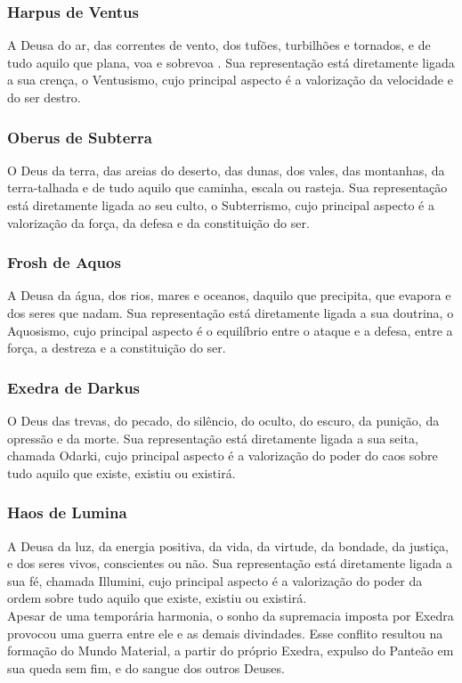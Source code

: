 \documentclass[10pt,twoside,twocolumn]{book}
\begin{document}
\subsubsection*{Harpus de Ventus}
A Deusa do ar, das correntes de vento, dos tufões, turbilhões e tornados, e de tudo aquilo que plana, voa e sobrevoa . Sua representação está diretamente ligada a sua crença, o Ventusismo, cujo principal aspecto é a valorização da velocidade e do ser destro. 
\subsubsection*{Oberus de Subterra}
O Deus da terra, das areias do deserto, das dunas, dos vales, das montanhas, da terra-talhada e de tudo aquilo que caminha, escala ou rasteja. Sua representação está diretamente ligada ao seu culto, o Subterrismo, cujo principal aspecto é a valorização da força, da defesa e da constituição do ser.
\subsubsection*{Frosh de Aquos}
A Deusa da água, dos rios, mares e oceanos, daquilo que precipita, que evapora e dos seres que nadam. Sua representação está diretamente ligada a sua doutrina, o Aquosismo, cujo principal aspecto é o equilíbrio entre o ataque e a defesa, entre a força, a destreza e a constituição do ser.
\subsubsection*{Exedra de Darkus}
O Deus das trevas, do pecado, do silêncio, do oculto, do escuro, da punição, da opressão e da morte. Sua representação está diretamente ligada a sua seita, chamada Odarki, cujo principal aspecto é a valorização do poder do caos sobre tudo aquilo que existe, existiu ou existirá.
\subsubsection*{Haos de Lumina}
A Deusa da luz, da energia positiva, da vida, da virtude, da bondade, da justiça, e dos seres vivos, conscientes ou não. Sua representação está diretamente ligada a sua fé, chamada Illumini, cujo principal aspecto é a valorização do poder da ordem sobre tudo aquilo que existe, existiu ou existirá. \\

Apesar de uma temporária harmonia, o sonho da supremacia imposta por Exedra provocou uma guerra entre ele e as demais divindades. Esse conflito resultou na formação do Mundo Material, a partir do próprio Exedra, expulso do Panteão em sua queda sem fim, e do sangue dos outros Deuses. 
\end{document}

